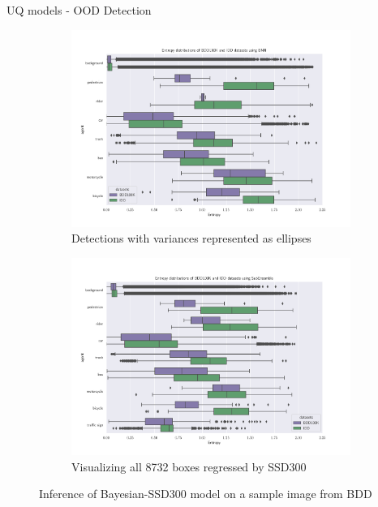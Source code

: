 \documentclass[10pt, aspectratio=169]{beamer}
\begin{document}
\begin{frame}[allowframebreaks]{UQ models - OOD Detection}
    \begin{figure}[H]
        \captionsetup[table]{skip=0pt}
            \centering
            \begin{subfigure}[t]{0.495\textwidth}
                \centering
                \includegraphics[width=\textwidth]{images/distributions/BNN_bdd_vs_iid_entropy.png}
                \caption{Detections with variances represented as ellipses}
            \end{subfigure}
            \begin{subfigure}[t]{0.495\textwidth}
                \centering
                \includegraphics[width=\textwidth]{images/distributions/SubEns_bdd_vs_iid_entropy.png}
                \caption{Visualizing all 8732 boxes regressed by SSD300}
            \end{subfigure}
            \caption{Inference of Bayesian-SSD300 model on a sample image from BDD}
    \end{figure}


\end{frame}
\end{document}
